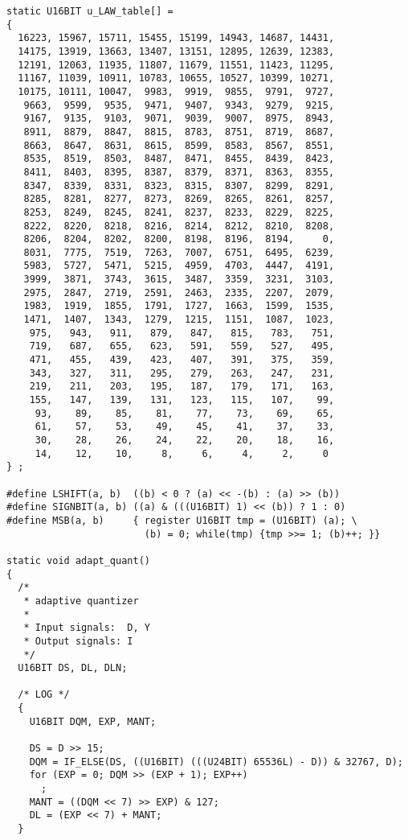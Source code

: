 \begin{verbatim}
static U16BIT u_LAW_table[] =
{
  16223, 15967, 15711, 15455, 15199, 14943, 14687, 14431, 
  14175, 13919, 13663, 13407, 13151, 12895, 12639, 12383, 
  12191, 12063, 11935, 11807, 11679, 11551, 11423, 11295, 
  11167, 11039, 10911, 10783, 10655, 10527, 10399, 10271, 
  10175, 10111, 10047,  9983,  9919,  9855,  9791,  9727, 
   9663,  9599,  9535,  9471,  9407,  9343,  9279,  9215, 
   9167,  9135,  9103,  9071,  9039,  9007,  8975,  8943, 
   8911,  8879,  8847,  8815,  8783,  8751,  8719,  8687, 
   8663,  8647,  8631,  8615,  8599,  8583,  8567,  8551, 
   8535,  8519,  8503,  8487,  8471,  8455,  8439,  8423, 
   8411,  8403,  8395,  8387,  8379,  8371,  8363,  8355, 
   8347,  8339,  8331,  8323,  8315,  8307,  8299,  8291, 
   8285,  8281,  8277,  8273,  8269,  8265,  8261,  8257, 
   8253,  8249,  8245,  8241,  8237,  8233,  8229,  8225, 
   8222,  8220,  8218,  8216,  8214,  8212,  8210,  8208, 
   8206,  8204,  8202,  8200,  8198,  8196,  8194,     0, 
   8031,  7775,  7519,  7263,  7007,  6751,  6495,  6239, 
   5983,  5727,  5471,  5215,  4959,  4703,  4447,  4191, 
   3999,  3871,  3743,  3615,  3487,  3359,  3231,  3103, 
   2975,  2847,  2719,  2591,  2463,  2335,  2207,  2079, 
   1983,  1919,  1855,  1791,  1727,  1663,  1599,  1535, 
   1471,  1407,  1343,  1279,  1215,  1151,  1087,  1023, 
    975,   943,   911,   879,   847,   815,   783,   751, 
    719,   687,   655,   623,   591,   559,   527,   495, 
    471,   455,   439,   423,   407,   391,   375,   359, 
    343,   327,   311,   295,   279,   263,   247,   231, 
    219,   211,   203,   195,   187,   179,   171,   163, 
    155,   147,   139,   131,   123,   115,   107,    99, 
     93,    89,    85,    81,    77,    73,    69,    65, 
     61,    57,    53,    49,    45,    41,    37,    33, 
     30,    28,    26,    24,    22,    20,    18,    16, 
     14,    12,    10,     8,     6,     4,     2,     0
} ;

#define LSHIFT(a, b)  ((b) < 0 ? (a) << -(b) : (a) >> (b))
#define SIGNBIT(a, b) ((a) & (((U16BIT) 1) << (b)) ? 1 : 0)
#define MSB(a, b)     { register U16BIT tmp = (U16BIT) (a); \
                        (b) = 0; while(tmp) {tmp >>= 1; (b)++; }}

static void adapt_quant()
{
  /*
   * adaptive quantizer
   *
   * Input signals:  D, Y
   * Output signals: I
   */
  U16BIT DS, DL, DLN;

  /* LOG */
  {
    U16BIT DQM, EXP, MANT;

    DS = D >> 15;
    DQM = IF_ELSE(DS, ((U16BIT) (((U24BIT) 65536L) - D)) & 32767, D);
    for (EXP = 0; DQM >> (EXP + 1); EXP++)
      ;
    MANT = ((DQM << 7) >> EXP) & 127;
    DL = (EXP << 7) + MANT;
  }
            

\end{verbatim}
